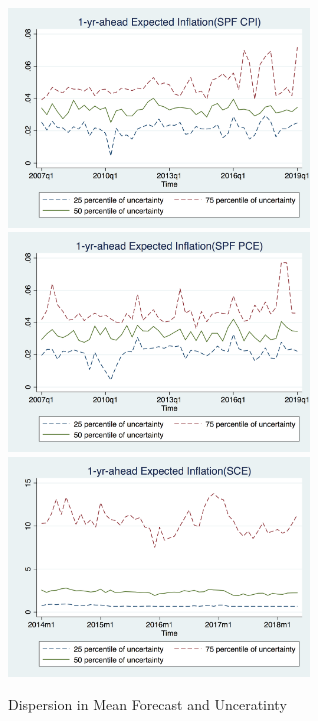 \documentclass[]{article}
\begin{document}
\begin{figure}[h]\label{IQR_Unceratitny}
	\centering
	\includegraphics[width=8cm]{figures/IQRvarCPIQ.png} \\
	\smallskip
	\includegraphics[width=8cm]{figures/IQRvarPCEQ.png}\\
		\smallskip
	\includegraphics[width=8cm]{figures/IQRvarSCEM.png}\\
	\caption{Dispersion in Mean Forecast and Unceratinty }
\end{figure}
\end{document}
